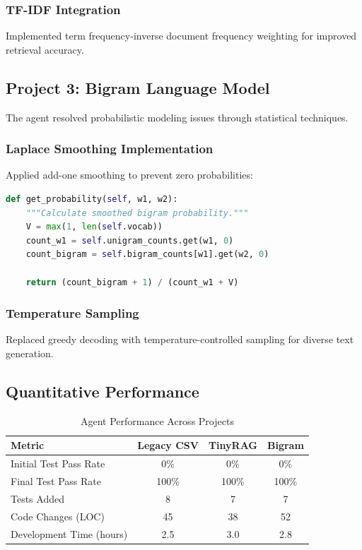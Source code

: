 \documentclass[12pt, a4paper]{article}
\begin{document}
\subsubsection{TF-IDF Integration}
Implemented term frequency-inverse document frequency weighting for improved retrieval accuracy.

\subsection{Project 3: Bigram Language Model}

The agent resolved probabilistic modeling issues through statistical techniques.

\subsubsection{Laplace Smoothing Implementation}
Applied add-one smoothing to prevent zero probabilities:

\begin{lstlisting}[language=Python, caption=Laplace Smoothing for Bigram Probabilities]
def get_probability(self, w1, w2):
    """Calculate smoothed bigram probability."""
    V = max(1, len(self.vocab))
    count_w1 = self.unigram_counts.get(w1, 0)
    count_bigram = self.bigram_counts[w1].get(w2, 0)

    return (count_bigram + 1) / (count_w1 + V)
\end{lstlisting}

\subsubsection{Temperature Sampling}
Replaced greedy decoding with temperature-controlled sampling for diverse text generation.

\subsection{Quantitative Performance}

\begin{table}[H]
    \centering
    \caption{Agent Performance Across Projects}
    \begin{tabular}{@{}lccc@{}}
        \toprule
        \textbf{Metric} & \textbf{Legacy CSV} & \textbf{TinyRAG} & \textbf{Bigram} \\
        \midrule
        Initial Test Pass Rate & 0\% & 0\% & 0\% \\
        Final Test Pass Rate & 100\% & 100\% & 100\% \\
        Tests Added & 8 & 7 & 7 \\
        Code Changes (LOC) & 45 & 38 & 52 \\
        Development Time (hours) & 2.5 & 3.0 & 2.8 \\
        \bottomrule
    \end{tabular}
    \label{tab:performance}
\end{table}
\end{document}

